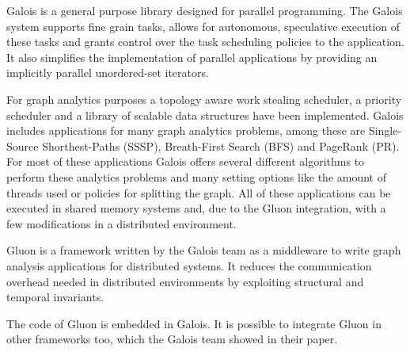 
Galois\cite{Galois} is a general purpose library designed for parallel programming. The Galois system supports fine grain tasks, allows for autonomous, speculative execution of these tasks and grants control over the task scheduling policies to the application. It also simplifies the implementation of parallel applications by providing an implicitly parallel unordered-set iterators.

For graph analytics purposes a topology aware work stealing scheduler, a priority scheduler and a library of scalable data structures have been implemented. Galois includes applications for many graph analytics problems, among these are Single-Source Shorthest-Paths (SSSP), Breath-First Search (BFS) and PageRank (PR). For most of these applications Galois offers several different algorithms to perform these analytics problems and many setting options like the amount of threads used or policies for splitting the graph. All of these applications can be executed in shared memory systems and, due to the Gluon integration, with a few modifications in a distributed environment.

Gluon\cite{vertGalois} is a framework written by the Galois team as a middleware to write graph analysis applications for distributed systems. It reduces the communication overhead needed in distributed environments by exploiting structural and temporal invariants.

The code of Gluon is embedded in Galois. It is possible to integrate Gluon in other frameworks too, which the Galois team showed in their paper\cite{vertGalois}.
